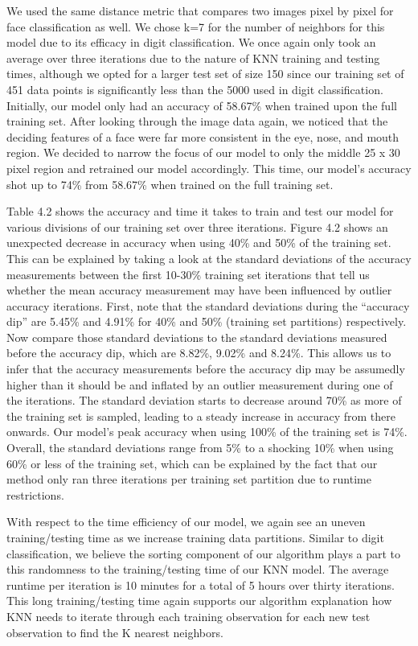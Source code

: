 \documentclass[10pt,parskip=half,
toc=sectionentrywithdots,
bibliography=totocnumbered,
captions=tableheading,numbers=noendperiod]{scrartcl}
\begin{document}
We used the same distance metric that compares two images pixel by pixel
for face classification as well. We chose k=7 for the number of
neighbors for this model due to its efficacy in digit classification. We
once again only took an average over three iterations due to the nature
of KNN training and testing times, although we opted for a larger test
set of size 150 since our training set of 451 data points is
significantly less than the 5000 used in digit classification.
Initially, our model only had an accuracy of 58.67\% when trained upon
the full training set. After looking through the image data again, we
noticed that the deciding features of a face were far more consistent in
the eye, nose, and mouth region. We decided to narrow the focus of our
model to only the middle 25 x 30 pixel region and retrained our model
accordingly. This time, our model's accuracy shot up to 74\% from
58.67\% when trained on the full training set.

Table 4.2 shows the accuracy and time it takes to train and test our
model for various divisions of our training set over three iterations.
Figure 4.2 shows an unexpected decrease in accuracy when using 40\% and
50\% of the training set. This can be explained by taking a look at the
standard deviations of the accuracy measurements between the first
10-30\% training set iterations that tell us whether the mean accuracy
measurement may have been influenced by outlier accuracy iterations.
First, note that the standard deviations during the ``accuracy dip'' are
5.45\% and 4.91\% for 40\% and 50\% (training set partitions)
respectively. Now compare those standard deviations to the standard
deviations measured before the accuracy dip, which are 8.82\%, 9.02\%
and 8.24\%. This allows us to infer that the accuracy measurements
before the accuracy dip may be assumedly higher than it should be and
inflated by an outlier measurement during one of the iterations. The
standard deviation starts to decrease around 70\% as more of the
training set is sampled, leading to a steady increase in accuracy from
there onwards. Our model's peak accuracy when using 100\% of the
training set is 74\%. Overall, the standard deviations range from 5\% to
a shocking 10\% when using 60\% or less of the training set, which can
be explained by the fact that our method only ran three iterations per
training set partition due to runtime restrictions.

With respect to the time efficiency of our model, we again see an uneven
training/testing time as we increase training data partitions. Similar
to digit classification, we believe the sorting component of our
algorithm plays a part to this randomness to the training/testing time
of our KNN model. The average runtime per iteration is 10 minutes for a
total of 5 hours over thirty iterations. This long training/testing time
again supports our algorithm explanation how KNN needs to iterate
through each training observation for each new test observation to find
the K nearest neighbors.
\end{document}
